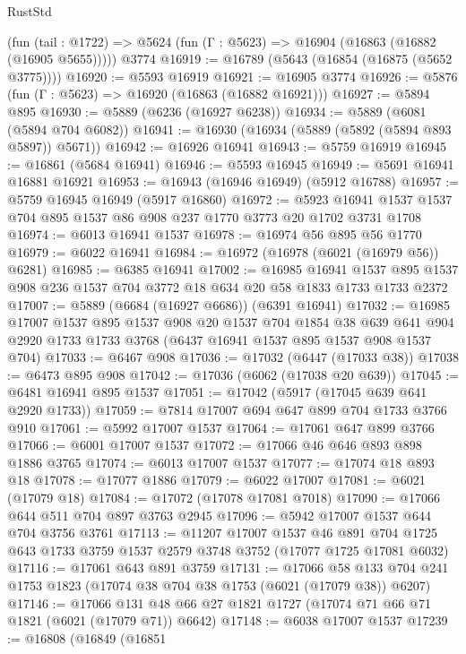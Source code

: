 \begin{lexlean}{RustStd}
\begin{coremodule}
    (fun (tail : @1722) => @5624 (fun (Γ : @5623) => @16904 (@16863 (@16882 (@16905 @5655)))))
    @3774
@16919 := @16789 (@5643 (@16854 (@16875 (@5652 @3775))))
@16920 := @5593 @16919
@16921 := @16905 @3774
@16926 := @5876 (fun (Γ : @5623) => @16920 (@16863 (@16882 @16921)))
@16927 := @5894 @895
@16930 := @5889 (@6236 (@16927 @6238))
@16934 := @5889 (@6081 (@5894 @704 @6082))
@16941 := @16930 (@16934 (@5889 (@5892 (@5894 @893 @5897)) @5671))
@16942 := @16926 @16941
@16943 := @5759 @16919
@16945 := @16861 (@5684 @16941)
@16946 := @5593 @16945
@16949 := @5691 @16941 @16881 @16921
@16953 := @16943 (@16946 @16949) (@5912 @16788)
@16957 := @5759 @16945 @16949 (@5917 @16860)
@16972 := @5923 @16941 @1537 @1537 @704 @895 @1537 @86 @908 @237 @1770 @3773 @20 @1702 @3731 @1708
@16974 := @6013 @16941 @1537
@16978 := @16974 @56 @895 @56 @1770
@16979 := @6022 @16941
@16984 := @16972 (@16978 (@6021 (@16979 @56)) @6281)
@16985 := @6385 @16941
@17002 := @16985
    @16941
    @1537
    @895
    @1537
    @908
    @236
    @1537
    @704
    @3772
    @18
    @634
    @20
    @58
    @1833
    @1733
    @1733
    @2372
@17007 := @5889 (@6684 (@16927 @6686)) (@6391 @16941)
@17032 := @16985
    @17007
    @1537
    @895
    @1537
    @908
    @20
    @1537
    @704
    @1854
    @38
    @639
    @641
    @904
    @2920
    @1733
    @1733
    @3768
    (@6437 @16941 @1537 @895 @1537 @908 @1537 @704)
@17033 := @6467 @908
@17036 := @17032 (@6447 (@17033 @38))
@17038 := @6473 @895 @908
@17042 := @17036 (@6062 (@17038 @20 @639))
@17045 := @6481 @16941 @895 @1537
@17051 := @17042 (@5917 (@17045 @639 @641 @2920 @1733))
@17059 := @7814 @17007 @694 @647 @899 @704 @1733 @3766 @910
@17061 := @5992 @17007 @1537
@17064 := @17061 @647 @899 @3766
@17066 := @6001 @17007 @1537
@17072 := @17066 @46 @646 @893 @898 @1886 @3765
@17074 := @6013 @17007 @1537
@17077 := @17074 @18 @893 @18
@17078 := @17077 @1886
@17079 := @6022 @17007
@17081 := @6021 (@17079 @18)
@17084 := @17072 (@17078 @17081 @7018)
@17090 := @17066 @644 @511 @704 @897 @3763 @2945
@17096 := @5942 @17007 @1537 @644 @704 @3756 @3761
@17113 := @11207
    @17007
    @1537
    @46
    @891
    @704
    @1725
    @643
    @1733
    @3759
    @1537
    @2579
    @3748
    @3752
    (@17077 @1725 @17081 @6032)
@17116 := @17061 @643 @891 @3759
@17131 := @17066
    @58
    @133
    @704
    @241
    @1753
    @1823
    (@17074 @38 @704 @38 @1753 (@6021 (@17079 @38)) @6207)
@17146 := @17066 @131 @48 @66 @27 @1821 @1727 (@17074 @71 @66 @71 @1821 (@6021 (@17079 @71)) @6642)
@17148 := @6038 @17007 @1537
@17239 := @16808
    (@16849
      (@16851

\end{coremodule}
\end{lexlean}
